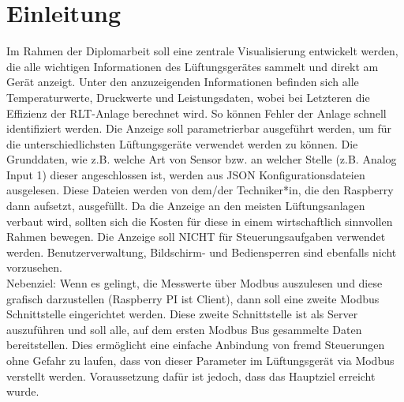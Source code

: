 \chapter{Einleitung} 
\label{aufgabenstellung}
\noindent Im Rahmen der Diplomarbeit soll eine zentrale Visualisierung entwickelt werden, die alle 
wichtigen Informationen des Lüftungsgerätes sammelt und direkt am Gerät anzeigt. Unter 
den anzuzeigenden Informationen befinden sich alle Temperaturwerte, Druckwerte und 
Leistungsdaten, wobei bei Letzteren die Effizienz der RLT-Anlage berechnet wird. So können 
Fehler der Anlage schnell identifiziert werden.
Die Anzeige soll parametrierbar ausgeführt werden, um für die unterschiedlichsten 
Lüftungsgeräte verwendet werden zu können. Die Grunddaten, wie z.B. welche Art von 
Sensor bzw. an welcher Stelle (z.B. Analog Input 1) dieser angeschlossen ist, werden aus JSON Konfigurationsdateien ausgelesen. Diese Dateien werden von dem/der Techniker*in, die den 
Raspberry dann aufsetzt, ausgefüllt.
Da die Anzeige an den meisten Lüftungsanlagen verbaut wird, sollten sich die Kosten für 
diese in einem wirtschaftlich sinnvollen Rahmen bewegen.
Die Anzeige soll NICHT für Steuerungsaufgaben verwendet werden. Benutzerverwaltung, 
Bildschirm- und Bediensperren sind ebenfalls nicht vorzusehen. \\

Nebenziel:
Wenn es gelingt, die Messwerte über Modbus auszulesen und diese grafisch darzustellen (Raspberry PI ist 
Client), dann soll eine zweite Modbus Schnittstelle eingerichtet werden. Diese zweite 
Schnittstelle ist als Server auszuführen und soll alle, auf dem ersten Modbus Bus
gesammelte Daten bereitstellen. Dies ermöglicht eine einfache Anbindung von fremd 
Steuerungen ohne Gefahr zu laufen, dass von dieser Parameter im Lüftungsgerät via 
Modbus verstellt werden. Voraussetzung dafür ist jedoch, dass das Hauptziel erreicht wurde.

